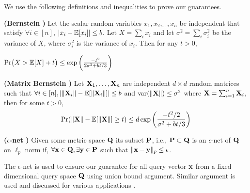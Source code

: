 We use the following definitions and inequalities to prove our guarantees.
\begin{theorem}{\label{thm:bernstein}}
\textbf{(Bernstein \cite{dubhashi2009concentration})} Let the scalar random variables $x_{1}, x_{2}, _{\cdots}, x_{n}$ be independent that satisfy $\forall i \in [n]$,  
$\vert x_{i}-\~E[x_{i}]\vert \leq b$. 
Let $X = \sum_{i} x_{i}$ and let $\sigma^{2} = \sum_{i} \sigma_{i}^{2}$ be the variance of $X$, where $\sigma_{i}^{2}$ is the variance of $x_{i}$. 
Then for any $t>0$,
\begin{center}
 $\mbox{Pr}\big(X > \~E[X] + t\big) \leq \exp\bigg(\frac{-t^{2}}{2\sigma^{2}+bt/3} \bigg)$
\end{center}
\end{theorem}
% 
\begin{theorem}{\label{thm:matrixBernstein}}
 \textbf{(Matrix Bernstein \cite{tropp2015introduction})} Let $\*X_{1},\ldots,\*X_{n}$ are independent $d \times d$ random matrices such that $\forall i \in [n], |\|\*X_{i}\| - \~E[\|\*X_{i}\|]| \leq b$ and $\mbox{var}(\|\*X\|) \leq \sigma^{2}$ where $\*X = \sum_{i=1}^{n}\*X_{i}$, then for some $t>0$,
 $$\mbox{Pr}(\|\*X\| - \~E[\|\*X\|] \geq t) \leq d\exp\bigg(\frac{-t^{2}/2}{\sigma^{2}+bt/3}\bigg)$$
\end{theorem}
% 
\begin{definition}{\label{argument:epsNet}} 
\textbf{($\epsilon$-net \cite{haussler1987e})} Given some metric space $\*Q$ its subset $\*P$, i.e., $\*P \subset \*Q$ is an $\epsilon$-net of $\*Q$ on $\ell_{p}$ norm if, $\forall \*x \in \*Q, \exists \*y \in \*P$ such that $\|\*x - \*y\|_{p} \leq \epsilon$.
\end{definition}
The $\epsilon$-net is used to ensure our guarantee for all query vector $\*x$ from a fixed dimensional query space $\*Q$ using union bound argument. Similar argument is used and discussed for various applications \cite{woodruff2014sketching}. 